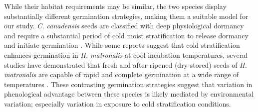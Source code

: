 \documentclass{article}[11pt]
\begin{document}
While their habitat requirements may be similar, the two species display substantially different germination strategies, making them a suitable model for our study. \textit{C. canadensis} seeds are classified with deep physiological dormancy and require a substantial period of cold moist stratification to release dormancy and initiate germination \citep{Baskin:1988um}. While some reports suggest that cold stratification enhances germination in \textit{H. matronalis} at cool incubation temperatures, several studies have demonstrated that fresh and after-ripened (dry-stored) seeds of \textit{H. matronalis} are capable of rapid and complete germination at a wide range of temperatures \citep{Susko:2008ut}. These contrasting germination strategies suggest that variation in phenological advantage between these species is likely mediated by environmental variation; especially variation in exposure to cold stratification conditions.


\end{document}

